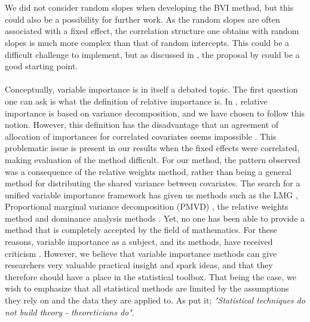 \\
\\
We did not consider random slopes when developing the BVI method, but this could also be a possibility for further work. As the random slopes are often associated with a fixed effect, the correlation structure one obtains with random slopes is much more complex than that of random intercepts. This could be a difficult challenge to implement, but as discussed in , the proposal by \citet{Johnson2014} could be a good starting point.
\\
\\
Conceptually, variable importance is in itself a debated topic. The first question one can ask is what the definition of relative importance is. In \citet{gromping_relaimpo}, relative importance is based on variance decomposition, and we have chosen to follow this notion. However, this definition has the disadvantage that an agreement of allocation of importances for correlated covariates seems impossible \citep{Gromping_2015}. This problematic issue is present in our results when the fixed effects were correlated, making evaluation of the method difficult. For our method, the pattern observed was a consequence of the relative weights method, rather than being a general method for distributing the shared variance between covariates. The search for a unified variable importance framework has given us methods such as the LMG \citep{gromping_relaimpo}, Proportional marginal variance decomposition (PMVD) \citep{gromping_relaimpo}, the relative weights method \citep{johnson_relative_weights} and dominance analysis methods \citep{budescu1993dominance}. Yet, no one has been able to provide a method that is completely accepted by the field of mathematics. For these reasons, variable importance as a subject, and its methods, have received criticism \citep{gromping_relaimpo}. However, we believe that variable importance methods can give researchers very valuable practical insight and spark ideas, and that they therefore should have a place in the statistical toolbox. That being the case, we wish to emphasize that all statistical methods are limited by the assumptions they rely on and the data they are applied to. As \citet{Sutherland_91} put it; \textit{"Statistical techniques do not build theory - theoreticians do"}.


